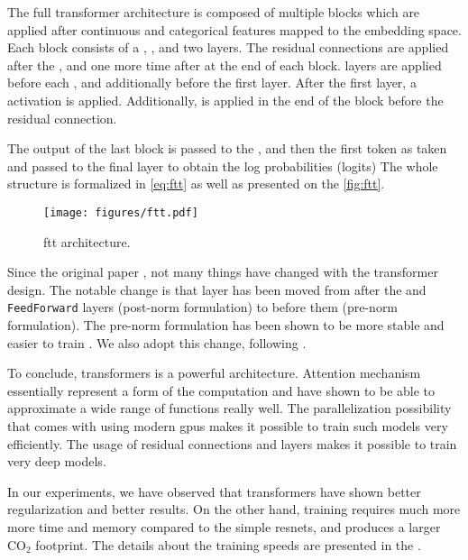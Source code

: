 The full transformer architecture is composed of multiple blocks which are applied after continuous and categorical
features mapped to the embedding space. Each block consists of a \LayerNorm, \MHA, and two \Linear
layers. The residual connections are applied after the \MHA, and one more time after at the end of each block.
\LayerNorm layers are applied before each \MHA, and additionally before the first \Linear layer. After the first \Linear
layer, a \GELU activation is applied. Additionally, \Dropout is applied in the end of the block before the residual
connection.

The output of the last block is passed to the \LayerNorm, and then the first token as taken and passed to the
final \Linear layer to obtain the log probabilities (logits) The whole structure is formalized in
\autoref{eq:ftt} as well as presented on the \autoref{fig:ftt}.


\begin{figure}[htbp]
    \centering
    \texttt{[image: figures/ftt.pdf]} \caption{\gls{ftt} architecture.}
    \label{fig:ftt}
\end{figure}


Since the original paper \cite{transformer}, not many things have changed with the transformer design. The notable
change is that \LayerNorm layer has been moved from after the \MHA and \texttt{FeedForward} layers
(post-norm formulation) to before them (pre-norm formulation). The pre-norm formulation has been shown to be more stable
and easier to train \cite{pre-norm}. We also adopt this change, following \cite{ft-transformer}.

To conclude, transformers is a powerful architecture. Attention mechanism essentially represent a form of the
computation and have shown to be able to approximate a wide range of functions really well. The parallelization
possibility that comes with using modern \gls{gpu}s makes it possible to train such models very efficiently. The usage
of residual connections and \LayerNorm layers makes it possible to train very deep models.

In our experiments, we have observed that transformers have shown better regularization and better results. On the other
hand, training requires much more more time and memory compared to the simple \glspl{resnet}, and produces a larger
$\text{CO}_2$ footprint. The details about the training speeds are presented in the .

